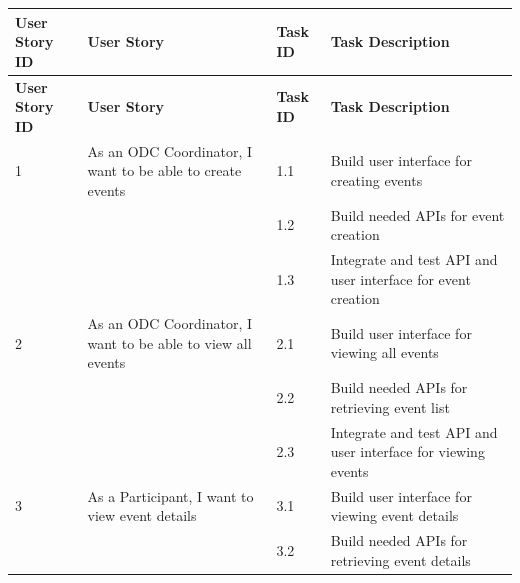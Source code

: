 \begin{longtable}{|p{2cm}|p{5cm}|p{2cm}|p{5cm}|}
  \hline
  \rowcolor{green!20} \textbf{User Story ID} & \textbf{User Story}                                            & \textbf{Task ID} & \textbf{Task Description}                                           \\ \hline
  \endfirsthead
  \hline
  \rowcolor{green!20} \textbf{User Story ID} & \textbf{User Story}                                            & \textbf{Task ID} & \textbf{Task Description}                                           \\ \hline
  \endhead
  \hline
  1                                          & As an ODC Coordinator, I want to be able to create events      & 1.1              & Build user interface for creating events                            \\ \cline{3-4}
                                             &                                                                & 1.2              & Build needed APIs for event creation                                \\ \cline{3-4}
                                             &                                                                & 1.3              & Integrate and test API and user interface for event creation        \\ \hline
  2                                          & As an ODC Coordinator, I want to be able to view all events    & 2.1              & Build user interface for viewing all events                         \\ \cline{3-4}
                                             &                                                                & 2.2              & Build needed APIs for retrieving event list                         \\ \cline{3-4}
                                             &                                                                & 2.3              & Integrate and test API and user interface for viewing events        \\ \hline
  3                                          & As a Participant, I want to view event details                 & 3.1              & Build user interface for viewing event details                      \\ \cline{3-4}
                                             &                                                                & 3.2              & Build needed APIs for retrieving event details                      \\ \cline{3-4}

\end{longtable}
